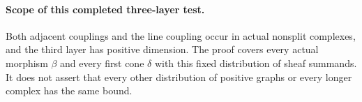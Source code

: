 \paragraph{Scope of this completed three-layer test.}
Both adjacent couplings and the line coupling occur in actual
nonsplit complexes, and the third layer has positive dimension.
The proof covers every actual morphism \(\beta\) and every first
cone \(\delta\) with this fixed distribution of sheaf summands.
It does not assert that every other distribution of positive graphs
or every longer complex has the same bound.
